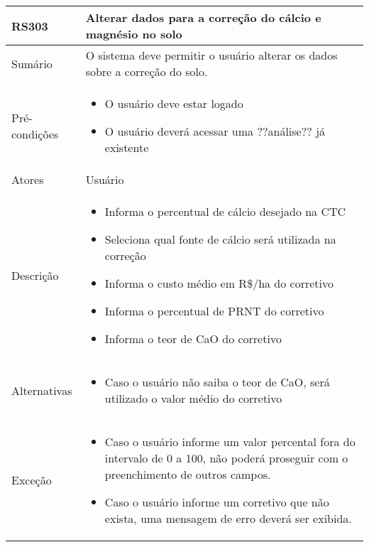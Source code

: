 \begin{quadro}[!htb]
    \begin{tabular}{|p{3cm}|p{11cm}|}
        \hline
        \textbf{RS303} & \textbf{Alterar dados para a correção do cálcio e magnésio no solo} \\
        \hline
        Sumário        & O sistema deve permitir o usuário alterar os dados sobre a correção do solo.                  \\
        \hline
        Pré-condições  & \begin{itemize}
            \item O usuário deve estar logado
            \item O usuário deverá acessar uma ??análise?? já existente 
        \end{itemize}                 \\
        \hline
        Atores         & Usuário                  \\
        \hline
        Descrição      &
        \begin{itemize}
            \item Informa o percentual de cálcio desejado na CTC
            \item Seleciona qual fonte de cálcio será utilizada na correção
            \item Informa o custo médio em R\$/ha do corretivo
            \item Informa o percentual de PRNT do corretivo
            \item Informa o teor de CaO do corretivo
        \end{itemize}                 \\
        \hline
        Alternativas   &
        \begin{itemize}
            \item Caso o usuário não saiba o teor de CaO, será utilizado o valor médio do corretivo
        \end{itemize}                 \\
        \hline
        Exceção        &
        \begin{itemize}
            \item Caso o usuário informe um valor percental fora do intervalo de 0 a 100, não poderá proseguir com o preenchimento de outros campos.
            \item Caso o usuário informe um corretivo que não exista, uma mensagem de erro deverá ser exibida.
        \end{itemize}                   \\
        \hline
    \end{tabular}
\end{quadro}

